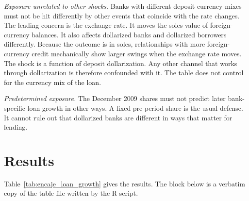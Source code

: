 \documentclass[11pt]{article}
\renewcommand{\_}{\origunderscore\hspace{0pt}}  %
\begin{document}
\textit{Exposure unrelated to other shocks.}
Banks with different deposit currency mixes must not be hit differently by other events that coincide with the rate changes.
The leading concern is the exchange rate.
It moves the soles value of foreign-currency balances.
It also affects dollarized banks and dollarized borrowers differently.
Because the outcome is in soles, relationships with more foreign-currency credit mechanically show larger swings when the exchange rate moves.
The shock is a function of deposit dollarization.
Any other channel that works through dollarization is therefore confounded with it.
The table does not control for the currency mix of the loan.

\textit{Predetermined exposure.}
The December 2009 shares must not predict later bank-specific loan growth in other ways.
A fixed pre-period share is the usual defense.
It cannot rule out that dollarized banks are different in ways that matter for lending.

\section{Results}
\label{sec:results}

Table~\ref{tab:encaje_loan_growth} gives the results.
The block below is a verbatim copy of the table file written by the R script.
\end{document}
